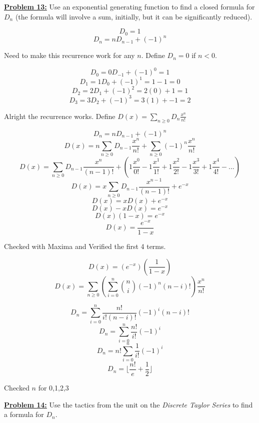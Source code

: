 \documentclass[10pt, AMS Euler]{article}
\begin{document}
	\noindent\underline{\bf Problem 13:}  Use an exponential generating function to find a closed formula for $D_n$ (the formula will involve a sum, initially, but it can be significantly reduced). 

    $$ D_0 = 1 $$
    $$ D_n = nD_{n-1} + (-1)^n $$

    Need to make this recurrence work for any $n$. Define $D_n=0$ if $n<0$.

    $$ D_0 = 0 D_{-1} + (-1)^0 = 1 $$
    $$ D_1 = 1 D_{0} + (-1)^1 = 1 - 1 = 0 $$
    $$ D_2 = 2 D_{1} + (-1)^2 = 2(0) + 1 = 1 $$
    $$ D_3 = 3 D_{2} + (-1)^3 = 3(1) + -1 = 2 $$
    
    Alright the recurrence works. Define $D(x) = \sum_{n \geq 0} D_n \frac{x^n}{n!}$

    $$ D_n = nD_{n-1} + (-1)^n $$
    $$ D(x) = n \sum_{n \geq 0} D_{n-1} \frac{x^n}{n!} + \sum_{n \geq 0} (-1)^n \frac{x^n}{n!} $$
    $$ D(x) = \sum_{n \geq 0} D_{n-1} \frac{x^n}{(n-1)!} + (1\frac{x^0}{0!} - 1\frac{x^1}{1!} + 1\frac{x^2}{2!} - 1\frac{x^3}{3!} + 1\frac{x^4}{4!} - ...) $$
    $$ D(x) = x \sum_{n \geq 0} D_{n-1} \frac{x^{n-1}}{(n-1)!} + e^{-x} $$
    $$ D(x) = x D(x) + e^{-x} $$
    $$ D(x) - x D(x) = e^{-x} $$
    $$ D(x)(1 - x) = e^{-x} $$
    $$ D(x) = \frac{e^{-x}}{1 - x} $$
    
    Checked with Maxima and Verified the first 4 terms.

    $$ D(x) = (e^{-x})(\frac{1}{1 - x}) $$
    $$ D(x) = \sum_{n \geq 0} (\sum_{i = 0}^n \binom{n}{i} (-1)^n (n-i)! ) \frac{x^n}{n!} $$
    
    $$ D_n = \sum_{i = 0}^n \frac{n!}{i!(n-i)!} (-1)^i (n-i)! $$
    $$ D_n = \sum_{i = 0}^n \frac{n!}{i!} (-1)^i $$
    $$ D_n = n! \sum_{i = 0}^n \frac{1}{i!} (-1)^i $$
    $$ D_n = \lfloor \frac{n!}{e} +\frac{1}{2} \rfloor $$

    Checked $n$ for 0,1,2,3
	
	\noindent\underline{\bf Problem 14:}  Use the tactics from the unit on the \emph{Discrete Taylor Series} to find a formula for $D_n$. 
	
\end{document}
